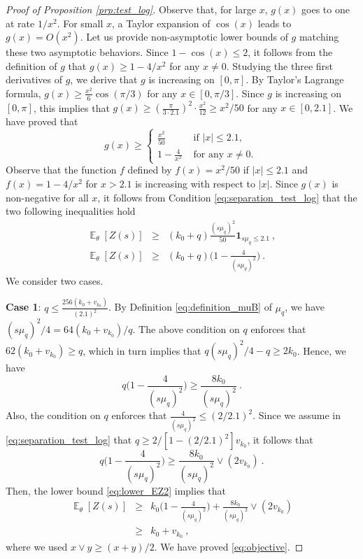 \documentclass[twoside,11pt]{article}
\def\beq{\begin{equation}}
\def\eeq{\end{equation}}
\def\beqn{\begin{eqnarray*}}
\def\eeqn{\end{eqnarray*}}
\newcommand{\E}{\operatorname{\mathbb{E}}}
\newcommand{\<}{\langle}
\renewcommand{\>}{\rangle}
\begin{document}
\begin{proof}[Proof of Proposition \ref{prp:test_log}]
Observe that, for large $x$, $g(x)$ goes to one at rate $1/x^2$. For small $x$, a Taylor expansion of $\cos(x)$ leads to $g(x)=O(x^2)$. Let us provide non-asymptotic lower bounds of $g$ matching these two asymptotic behaviors. Since $1-\cos(x)\leq 2$, it follows from the definition of $g$ that $g(x)\geq 1-4/x^2$ for any $x\neq 0$. Studying the three first derivatives of $g$, we derive that $g$ is increasing on $[0,\pi]$.  By Taylor's Lagrange formula, $g(x)\geq  \frac{x^2}{6}\cos(\pi/3)$ for any $x\in [0,\pi/3]$. Since $g$ is increasing on $[0,\pi]$, this implies that $g(x)\geq (\frac{\pi}{3\cdot 2.1})^2\cdot \frac{x^2}{12}\geq x^2/50$ for any $x\in [0,2.1]$.  We have proved that
\beq\label{lower_W}
g(x)\geq \left\{ \begin{array}{cc}
\frac{x^2}{50}& \text{ if } |x|\leq 2.1,\\
1 - \frac{4}{x^2} & \text{ for any }x\neq 0. \ 
                                                                \end{array}
\right.
\eeq 
Observe that the function $f$ defined by $f(x)= x^2/50$ if $|x|\leq 2.1$ and $f(x)=1-4/x^2$ for $x>2.1$ is increasing with respect to $|x|$. Since $g(x)$ is non-negative for all $x$, it follows from Condition \eqref{eq:separation_test_log} that the two following inequalities hold
\begin{eqnarray} \label{eq:lower_EZ1}
 \E_{\theta}[Z(s)]&\geq& (k_0+q) \frac{(s\mu_{q})^2}{50}\mathbf{1}_{s\mu_{q}\leq 2.1}\ , \\
 \E_{\theta}[Z(s)]&\geq& (k_0+q) \Big(  1- \frac{4}{(s\mu_{q})^2}\Big) \ .\label{eq:lower_EZ2}
\end{eqnarray}
We consider two cases.


\noindent 
{\bf Case 1}: $q\leq \frac{256(k_0+v_{k_0})}{(2.1)^2}$. By Definition \eqref{eq:definition_muB}  of $\mu_{q}$, we have
$(s\mu_q)^2/4= 64(k_0+v_{k_0})/q$. The above condition on $q$ enforces that $62(k_0+v_{k_0})\geq q$, which in turn implies that 
$q(s\mu_q)^2/4-q\geq 2k_0$. Hence, we have
\[
 q \Big(  1- \frac{4}{(s\mu_{q})^2}\Big) \geq \frac{8 k_0}{(s\mu_{q})^2} \ . 
\]
Also, the condition on $q$ enforces that $\frac{4}{(s\mu_{q})^2}\leq (2/2.1)^2$. Since we assume in \eqref{eq:separation_test_log} that  $q\geq   2/[1-(2/2.1)^2]v_{k_0}$, it follows that
\[
 q \Big(  1- \frac{4}{(s\mu_{q})^2}\Big) \geq \frac{8 k_0}{(s\mu_{q})^2} \vee (2v_{k_0})\ . 
\]
Then, the lower bound \eqref{eq:lower_EZ2} implies that 
\beqn 
\E_{\theta}[Z(s)] &\geq& k_0 \Big(  1- \frac{4}{(s\mu_{q})^2}\Big) + \frac{8 k_0}{(s\mu_{q})^2} \vee (2v_{k_0})\\
&\geq  & k_0 + v_{k_0}\ ,
\eeqn 
where we used $x\vee y\geq (x+y)/2$. We have proved \eqref{eq:objective}.


\end{proof}
\end{document}
